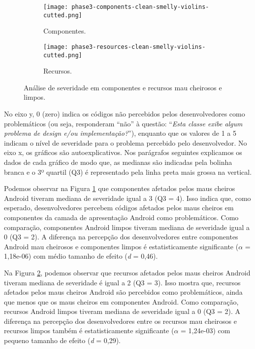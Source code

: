 \begin{figure*}[!htb]
\centering
{}\textwidth
\captionsetup[subfigure]{width=.9\imagewidth,justification=raggedright}%
\begin{subfigure}[t]{.49\textwidth}
  \centering
  \hspace*{-1cm}%
  \texttt{[image: phase3-components-clean-smelly-violins-cutted.png]}
  \caption{Componentes.}
  \label{fig:components-violins}
\end{subfigure}
\begin{subfigure}[t]{.49\textwidth}
  \centering
  \texttt{[image: phase3-resources-clean-smelly-violins-cutted.png]}
  \caption{Recursos.}
  \label{fig:resources-violins}
\end{subfigure}%
\caption{Análise de severidade em componentes e recursos mau cheirosos e limpos.}
\label{fig:smelly-clean-consolidado}
\end{figure*}

No eixo y, 0 (zero) indica os códigos não percebidos pelos desenvolvedores como problemáticos (ou seja, responderam ``não'' à questão: ``\emph{Esta classe exibe algum problema de design e/ou implementação?}''), enquanto que os valores de 1 a 5 indicam o nível de severidade para o problema percebido pelo desenvolvedor. No eixo x, os gráficos são autoexplicativos. Nos parágrafos seguintes explicamos os dados de cada gráfico de modo que, as medianas são indicadas pela bolinha branca e o 3º quartil (Q3) é representado pela linha preta mais grossa na vertical.

Podemos observar na Figura \ref{fig:components-violins} que componentes afetados pelos maus cheiros Android tiveram mediana de severidade igual a 3 (Q3 = 4). Isso indica que, como esperado, desenvolvedores percebem códigos afetados pelos maus cheiros em componentes da camada de apresentação Android como problemáticos. Como comparação, componentes Android limpos tiveram mediana de severidade igual a 0 (Q3 = 2). A diferença na percepção dos desenvolvedores entre componentes Android mau cheirosos e componentes limpos é estatisticamente significante ($\alpha$ = 1,18e-06) com médio tamanho de efeito (\textit{d} = 0,46). 

Na Figura \ref{fig:resources-violins}, podemos observar que recursos afetados pelos maus cheiros Android tiveram mediana de severidade é igual a 2 (Q3 = 3). Isso mostra que, recursos afetados pelos maus cheiros Android são percebidos como problemáticos, ainda que menos que os maus cheiros em componentes Android. Como comparação, recursos Android limpos tiveram mediana de severidade igual a 0 (Q3 = 2). A diferença na percepção dos desenvolvedores entre os recursos mau cheirosos e recursos limpos também é estatisticamente significante ($\alpha$ = 1,24e-03) com pequeno tamanho de efeito (\textit{d} = 0,29).

